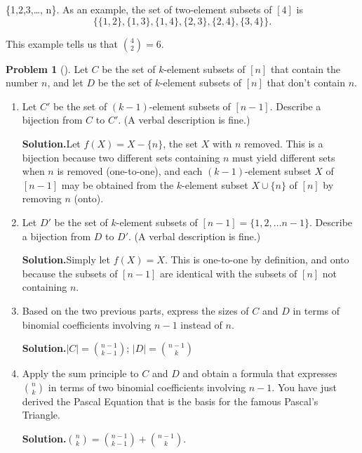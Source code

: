 \documentclass[10pt,]{book}
\theoremstyle{plain}
\theoremstyle{definition}
\newtheorem{activity}[project]{Problem}
\theoremstyle{definition}
\numberwithin{equation}{chapter}
\begin{document}
\{1,2,3,\ldots, n\}\). As an example, the set of two-element subsets of \([4]\) is%
\begin{equation*}
\{\{1,2\}, \{1,3\}, \{1,4\}, \{2,3\}, \{2,4\}, \{3,4\}\}.
\end{equation*}
%
\par
This example tells us that \(\binom{4}{2} = 6\).%
\begin{activity}[]\label{Pascal}
Let \(C\) be the set of \(k\)-element subsets of \([n]\) that contain the number \(n\), and let \(D\) be the set of \(k\)-element subsets of \([n]\) that don't contain \(n\).%
\begin{enumerate}[font=\bfseries,label=(\alph*),ref=\alph*]
\item\label{task-21} Let \(C'\) be the set of \((k-1)\)-element subsets of \([n-1]\).  Describe a bijection from \(C\) to \(C'\).  (A verbal description is fine.)%
\par\medskip\noindent%
\textbf{Solution.}\quad Let \(f(X) = X-\{n\}\), the set \(X\) with \(n\) removed. This is a bijection because two different sets containing \(n\) must yield different sets when \(n\) is removed (one-to-one), and each \((k-1)\)-element subset \(X\) of \([n-1]\) may be obtained from the \(k\)-element subset \(X\cup \{n\}\) of \([n]\) by removing \(n\) (onto).%
\item\label{task-22} Let \(D'\) be the set of \(k\)-element subsets of \([n-1]=\{1,2,\ldots n-1\}\).  Describe a bijection from \(D\) to \(D'\). (A verbal description is fine.)%
\par\medskip\noindent%
\textbf{Solution.}\quad Simply let \(f(X) =X\). This is one-to-one by definition, and onto because the subsets of \([n-1]\) are identical with the subsets of \([n]\) not containing \(n\).%
\item\label{task-23} Based on the two previous parts, express the sizes of \(C\) and \(D\) in terms of binomial coefficients involving \(n-1\) instead of \(n\).%
\par\medskip\noindent%
\textbf{Solution.}\quad \(|C|= \binom{n-1}{k-1}\); \(|D| = \binom{n-1}{k}\)%
\item\label{task-24} Apply the sum principle to \(C\) and \(D\) and obtain a formula that expresses \(\binom{n}{k}\) in terms of two binomial coefficients involving \(n-1\).  You have just derived the Pascal Equation that is the basis for the famous Pascal's Triangle.%
\par\medskip\noindent%
\textbf{Solution.}\quad \(\binom{n}{k} = \binom{n-1}{k-1} +\binom{n-1}{k}\).%
\end{enumerate}
\end{activity}
\typeout{************************************************}
\typeout{************************************************}
\end{document}

